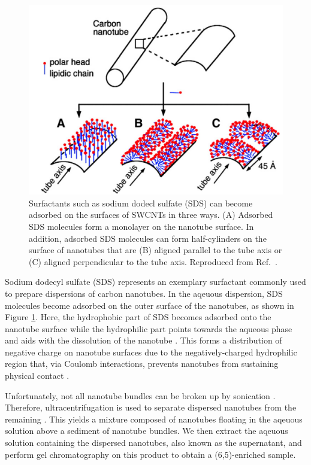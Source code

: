 \begin{figure}[H]
\centering
\includegraphics[scale=0.3]{images/chapter_methods/surfactant_tkalya}
\caption{Surfactants such as sodium dodecl sulfate (SDS) can become adsorbed on the surfaces of SWCNTs in three ways. (A) Adsorbed SDS molecules form a monolayer on the nanotube surface. In addition, adsorbed SDS molecules can form half-cylinders on the surface of nanotubes that are (B) aligned parallel to the tube axis or (C) aligned perpendicular to the tube axis. Reproduced from Ref.\ \cite{richard2003supramolecular}. }
\label{fig:sds_molecule}
\end{figure}


Sodium dodecyl sulfate (SDS) represents an exemplary surfactant commonly used to prepare dispersions of carbon nanotubes. In the aqeuous dispersion, SDS molecules become adsorbed on the outer surface of the nanotubes, as shown in Figure \ref{fig:sds_molecule}. Here, the hydrophobic part of SDS becomes adsorbed onto the nanotube surface while the hydrophilic part points towards the aqueous phase and aids with the dissolution of the nanotube \cite{richard2003supramolecular}. This forms a distribution of negative charge on nanotube surfaces due to the negatively-charged hydrophilic region that, via Coulomb interactions, prevents nanotubes from sustaining physical contact \cite{richard2003supramolecular}.


Unfortunately, not all nanotube bundles can be broken up by sonication \cite{o2002band}. Therefore, ultracentrifugation is used to separate dispersed nanotubes from the remaining  \cite{o2002band}. This yields a mixture composed of nanotubes floating in the aqeuous solution above a sediment of nanotube bundles. We then extract the aqeuous solution containing the dispersed nanotubes, also known as the supernatant, and perform gel chromatography on this product to obtain a (6,5)-enriched sample.

